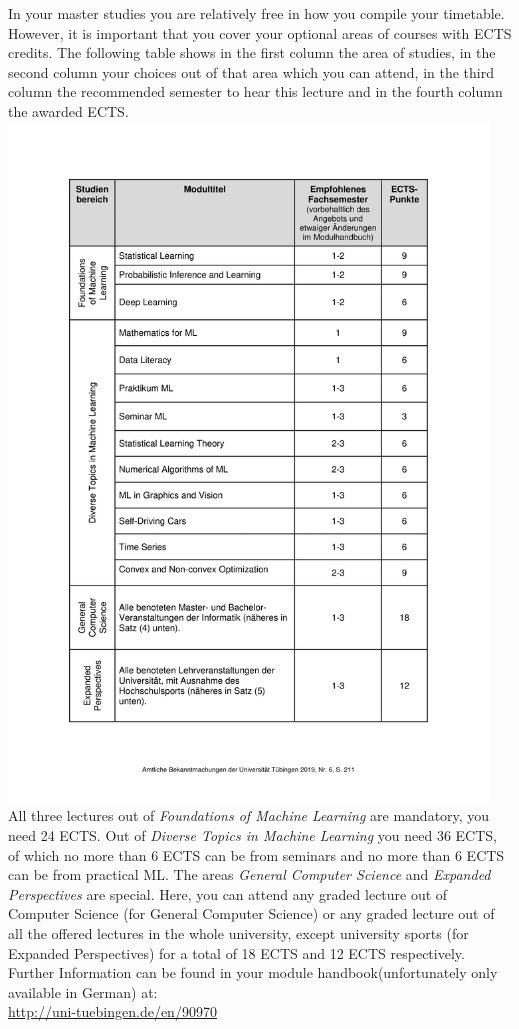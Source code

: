 In your master studies you are relatively free in how you compile your timetable. However, it is important that you cover your optional areas of courses with ECTS credits. The following table shows in the first column the area of studies, in the second column your choices out of that area which you can attend, in the third column the recommended semester to hear this lecture and in the fourth column the awarded ECTS.\\
\includegraphics[height=18cm]{media/ml-msc-uebersicht}~\\
All three lectures out of \emph{Foundations of Machine Learning} are mandatory, you need 24 ECTS. Out of \emph{Diverse Topics in Machine Learning} you need 36 ECTS, of which no more than 6 ECTS can be from seminars and no more than 6 ECTS can be from practical ML. The areas \emph{General Computer Science} and \emph{Expanded Perspectives} are special. Here, you can attend any graded lecture out of Computer Science (for General Computer Science) or any graded lecture out
of all the offered lectures in the whole university, except university sports (for Expanded Perspectives) for a total of 18 ECTS and 12 ECTS respectively.
Further Information can be found in your module handbook(unfortunately only available in German) at:\\
\url{http://uni-tuebingen.de/en/90970}
